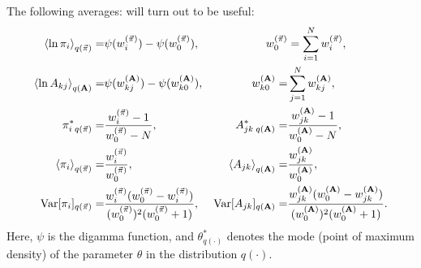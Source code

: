 The following averages\cite{Beal2003}: will turn out to be useful:
\begin{align}
  \left\langle \ln \pi_i\right\rangle_{q(\vec{\pi})}=&\psi(w_i^{(\vec{\pi})})-\psi(w_0^{(\vec{\pi})}),
  &w_0^{(\vec{\pi})}&=\sum_{i=1}^Nw_i^{(\vec{\pi})},\label{lnpiaverage}\\
  \left\langle \ln A_{kj}\right\rangle_{q(\mathbf{A})}=&\psi(w_{kj}^{(\mathbf{A})})
    -\psi(w_{k0}^{(\mathbf{A})}),
  &w_{k0}^{(\mathbf{A})}=&\sum_{j=1}^Nw_{kj}^{(\mathbf{A})},\\
  \pi^*_{i\;q(\vec\pi)}=&\frac{w_i^{(\vec\pi)}-1}{w_0^{(\vec\pi)}-N}, &
  A^*_{jk\;q(\mathbf{A})}=&\frac{w_{jk}^{(\mathbf{A})}-1}{w_0^{(\mathbf{A})}-N},\label{Dirmode}\\
  \left\langle \pi_i\right\rangle_{q(\vec{\pi})}=&\frac{w_i^{(\vec\pi)}}{w_0^{(\vec\pi)}}, &
    \left\langle A_{jk}\right\rangle_{q(\mathbf{A})}=&\frac{w_{jk}^{(\mathbf{A})}}{w_0^{(\mathbf{A})}},\label{Dirmean}\\
  \text{Var}[\pi_i]_{q(\vec{\pi})}=&
  \frac{w_i^{(\vec\pi)}(w_0^{(\vec\pi)}-w_i^{(\vec\pi)})}{
    (w_0^{(\vec\pi)})^2(w_0^{(\vec\pi)}+1)},&
    \text{Var}[A_{jk}]_{q(\mathbf{A})}=&\frac{w_{jk}^{(\mathbf{A})}(w_0^{(\mathbf{A})}
      -w_{jk}^{(\mathbf{A})})}{
    (w_0^{(\mathbf{A})})^2(w_0^{(\mathbf{A})}+1)}.\label{Dirvar}
\end{align}
Here, $\psi$ is the digamma function, and $\theta^*_{q(\cdot)}$
denotes the mode (point of maximum density) of the parameter $\theta$
in the distribution $q(\cdot)$.

